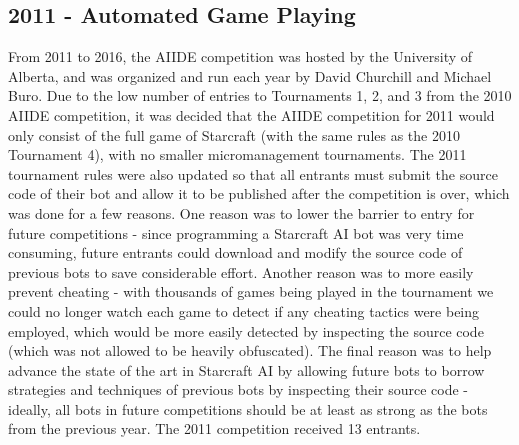 \subsection{2011 - Automated Game Playing}
From 2011 to 2016, the AIIDE competition was hosted by the University of Alberta, and was organized and run each year by David Churchill and Michael Buro. Due to the low number of entries to Tournaments 1, 2, and 3 from the 2010 AIIDE competition, it was decided that the AIIDE competition for 2011 would only consist of the full game of Starcraft (with the same rules as the 2010 Tournament 4), with no smaller micromanagement tournaments. The 2011 tournament rules were also updated so that all entrants must submit the source code of their bot and allow it to be published after the competition is over, which was done for a few reasons. One reason was to lower the barrier to entry for future competitions - since programming a Starcraft AI bot was very time consuming, future entrants could download and modify the source code of previous bots to save considerable effort. Another reason was to more easily prevent cheating - with thousands of games being played in the tournament we could no longer watch each game to detect if any cheating tactics were being employed, which would be more easily detected by inspecting the source code (which was not allowed to be heavily obfuscated). The final reason was to help advance the state of the art in Starcraft AI by allowing future bots to borrow strategies and techniques of previous bots by inspecting their source code - ideally, all bots in future competitions should be at least as strong as the bots from the previous year. The 2011 competition received 13 entrants. 

